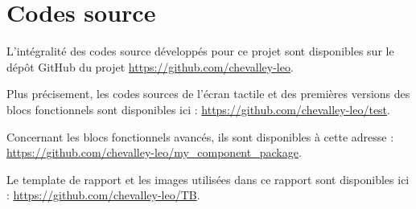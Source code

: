 \chapter{Codes source}
\label{chap:codes}

L'intégralité des codes source développés pour ce projet sont disponibles sur le dépôt GitHub du projet \url{https://github.com/chevalley-leo}.

Plus précisement, les codes sources de l'écran tactile et des premières versions des blocs fonctionnels sont disponibles ici : \url{https://github.com/chevalley-leo/test}.

Concernant les blocs fonctionnels avancés, ils sont disponibles à cette adresse : \url{https://github.com/chevalley-leo/my_component_package}.

Le template de rapport et les images utilisées dans ce rapport sont disponibles ici : \url{https://github.com/chevalley-leo/TB}.

